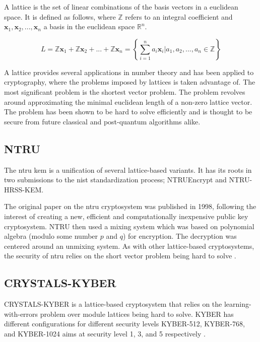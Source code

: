A lattice is the set of linear combinations of the basis vectors in a euclidean space. It is defined as follows, where $\mathbb{Z}$ refers to an integral coefficient and $\mathbf{x}_1,\mathbf{x}_2,...,\mathbf{x}_n$ a basis in the euclidean space $\mathbb{R}^n$\cite{bremner2012}.

$$
L=\mathbb{Z}\mathbf{x}_1+\mathbb{Z}\mathbf{x}_2+...+\mathbb{Z}\mathbf{x}_n=\left\{\sum_{i=1}^n a_i\mathbf{x}_i|a_1,a_2,...,a_n\in\mathbb{Z}\right\}
$$

\noindent A lattice provides several applications in number theory and has been applied to cryptography, where the problems imposed by lattices is taken advantage of\cite{bremner2012}. The most significant problem is the shortest vector problem. The problem revolves around approximating the minimal euclidean length of a non-zero lattice vector. The problem has been shown to be hard to solve efficiently and is thought to be secure from future classical and post-quantum algorithms alike\cite{sun2020}.

\subsection{NTRU}

The \gls{ntru} \gls{kem} is a unification of several lattice-based variants. It has its roots in two submissions to the \gls{nist} standardization process; NTRUEncrypt and NTRU-HRSS-KEM.

The original paper on the \gls{ntru} cryptosystem was published in 1998, following the interest of creating a new, efficient and computationally inexpensive public key cryptosystem\cite{ntru1998}. NTRU then used a mixing system which was based on polynomial algebra (modulo some number $p$ and $q$) for encryption. The decryption was centered around an unmixing system. As with other lattice-based cryptosystems, the security of \gls{ntru} relies on the short vector problem being hard to solve \cite{sun2020, ntru1998}.


\subsection{CRYSTALS-KYBER}
CRYSTALS-KYBER is a lattice-based cryptosystem that relies on the learning-with-errors problem over module lattices being hard to solve. KYBER has different configurations for different security levels KYBER-512,  KYBER-768, and KYBER-1024 aims at security level 1, 3, and 5 respectively \cite{kyber2021}.

